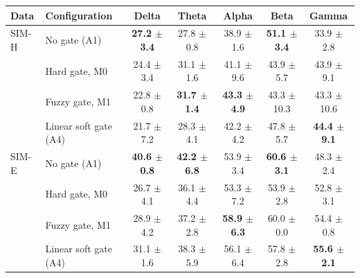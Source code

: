 \begin{tabular}{@{}llccccc@{}}
\toprule
Data & Configuration & Delta & Theta & Alpha & Beta & Gamma\\
\midrule
SIM-H & No gate (A1) & \textbf{27.2 $\pm$ 3.4} & 27.8 $\pm$ 0.8 & 38.9 $\pm$ 1.6 & \textbf{51.1 $\pm$ 3.4} & 33.9 $\pm$ 2.8\\
 & Hard gate, M0 & 24.4 $\pm$ 3.4 & 31.1 $\pm$ 1.6 & 41.1 $\pm$ 9.6 & 43.9 $\pm$ 5.7 & 43.9 $\pm$ 9.1\\
 & Fuzzy gate, M1 & 22.8 $\pm$ 0.8 & \textbf{31.7 $\pm$ 1.4} & \textbf{43.3 $\pm$ 4.9} & 43.3 $\pm$ 10.3 & 43.3 $\pm$ 10.6\\
 & Linear soft gate (A4) & 21.7 $\pm$ 7.2 & 28.3 $\pm$ 4.1 & 42.2 $\pm$ 4.2 & 47.8 $\pm$ 5.7 & \textbf{44.4 $\pm$ 9.1}\\
\midrule
SIM-E & No gate (A1) & \textbf{40.6 $\pm$ 0.8} & \textbf{42.2 $\pm$ 6.8} & 53.9 $\pm$ 3.4 & \textbf{60.6 $\pm$ 3.1} & 48.3 $\pm$ 2.4\\
 & Hard gate, M0 & 26.7 $\pm$ 4.1 & 36.1 $\pm$ 4.4 & 53.3 $\pm$ 7.2 & 53.9 $\pm$ 2.8 & 52.8 $\pm$ 3.1\\
 & Fuzzy gate, M1 & 28.9 $\pm$ 4.2 & 37.2 $\pm$ 2.8 & \textbf{58.9 $\pm$ 6.3} & 60.0 $\pm$ 0.0 & 54.4 $\pm$ 0.8\\
 & Linear soft gate (A4) & 31.1 $\pm$ 1.6 & 38.3 $\pm$ 5.9 & 56.1 $\pm$ 6.4 & 57.8 $\pm$ 2.8 & \textbf{55.6 $\pm$ 2.1}\\
\bottomrule
\end{tabular}
